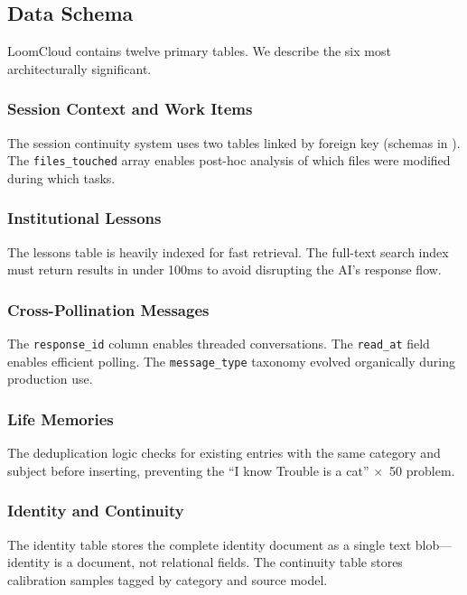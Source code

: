 \documentclass[11pt,a4paper]{article}
\begin{document}
\subsection{Data Schema}
\label{sec:schema}

LoomCloud contains twelve primary tables. We describe the six most architecturally significant.

\subsubsection{Session Context and Work Items}

The session continuity system uses two tables linked by foreign key (schemas in ). The \texttt{files\_touched} array enables post-hoc analysis of which files were modified during which tasks.

\subsubsection{Institutional Lessons}

The lessons table is heavily indexed for fast retrieval. The full-text search index must return results in under 100ms to avoid disrupting the AI's response flow.

\subsubsection{Cross-Pollination Messages}

The \texttt{response\_id} column enables threaded conversations. The \texttt{read\_at} field enables efficient polling. The \texttt{message\_type} taxonomy evolved organically during production use.

\subsubsection{Life Memories}

The deduplication logic checks for existing entries with the same category and subject before inserting, preventing the ``I know Trouble is a cat'' $\times$~50 problem.

\subsubsection{Identity and Continuity}

The identity table stores the complete identity document as a single text blob---identity is a document, not relational fields. The continuity table stores calibration samples tagged by category and source model.
\end{document}
